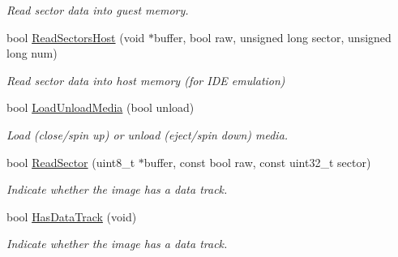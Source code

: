 \begin{DoxyCompactItemize}
\begin{DoxyCompactList}\small\item\em Read sector data into guest memory. \end{DoxyCompactList}\item 
\hypertarget{classCDROM__Interface__Image_ae686caa17e265089d6cd1a69ecc5b332}{bool \hyperlink{classCDROM__Interface__Image_ae686caa17e265089d6cd1a69ecc5b332}{Read\-Sectors\-Host} (void $\ast$buffer, bool raw, unsigned long sector, unsigned long num)}\label{classCDROM__Interface__Image_ae686caa17e265089d6cd1a69ecc5b332}

\begin{DoxyCompactList}\small\item\em Read sector data into host memory (for I\-D\-E emulation) \end{DoxyCompactList}\item 
\hypertarget{classCDROM__Interface__Image_af5aa7f94de1d7c77ff6b484b380c5351}{bool \hyperlink{classCDROM__Interface__Image_af5aa7f94de1d7c77ff6b484b380c5351}{Load\-Unload\-Media} (bool unload)}\label{classCDROM__Interface__Image_af5aa7f94de1d7c77ff6b484b380c5351}

\begin{DoxyCompactList}\small\item\em Load (close/spin up) or unload (eject/spin down) media. \end{DoxyCompactList}\item 
\hypertarget{classCDROM__Interface__Image_aa30f347bb164b16e2939d467a57578d7}{bool \hyperlink{classCDROM__Interface__Image_aa30f347bb164b16e2939d467a57578d7}{Read\-Sector} (uint8\-\_\-t $\ast$buffer, const bool raw, const uint32\-\_\-t sector)}\label{classCDROM__Interface__Image_aa30f347bb164b16e2939d467a57578d7}

\begin{DoxyCompactList}\small\item\em Indicate whether the image has a data track. \end{DoxyCompactList}\item 
\hypertarget{classCDROM__Interface__Image_a7348536d197510d1442419f2aa172ccc}{bool \hyperlink{classCDROM__Interface__Image_a7348536d197510d1442419f2aa172ccc}{Has\-Data\-Track} (void)}\label{classCDROM__Interface__Image_a7348536d197510d1442419f2aa172ccc}

\begin{DoxyCompactList}\small\item\em Indicate whether the image has a data track. \end{DoxyCompactList}\end{DoxyCompactItemize}
